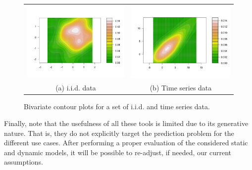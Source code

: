 \begin{itemize}
\begin{figure} [ht!]
\begin{center}
\begin{tabular}{cc}
\includegraphics[scale=0.25]{./figures/BivariateGaussian} &
\includegraphics[scale=0.25]{./figures/BivariateTimeSerie} \\
(a) i.i.d. data & (b)  Time series data \\
\end{tabular}
\caption{\label{Figure:PreliminariesBivariates}Bivariate contour plots for a set of i.i.d. and time series data. 
}
\end{center}
\end{figure}

\end{itemize}

Finally, note that the usefulness of all these tools is limited due to its generative nature. That is, they do not explicitly target the prediction problem for the different use cases. After performing a proper evaluation of the considered static and dynamic models, it will be possible to re-adjust, if needed, our current assumptions. 
